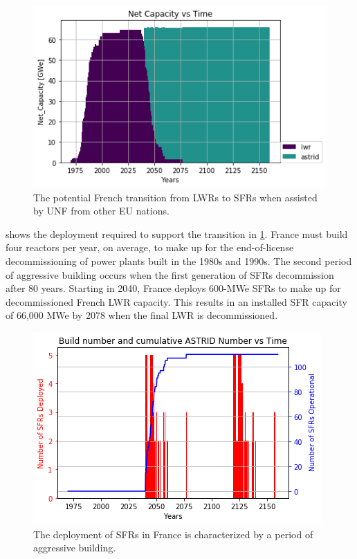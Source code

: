 \documentclass{article}
\begin{document}
\begin{figure}[htbp!]
        \begin{center}
                \includegraphics[scale=0.6]{./images/french-transition/power_plot.png}
        \end{center}
        \caption{The potential French transition from \glspl{LWR} to 
                \glspl{SFR} when assisted by \gls{UNF} from other \gls{EU} 
        nations.}
        \label{fig:sfr_num}
\end{figure}

 shows the deployment required to support the transition in 
\cref{fig:sfr_num}. France must build four reactors per year, on average, to 
make up for the end-of-license decommissioning of power plants built in the 1980s and 1990s.  The second period of aggressive building occurs when the first generation of \glspl{SFR} decommission after 80 years. Starting in 2040, France deploys 600-\gls{MWe} \glspl{SFR} to make up for 
decommissioned French \gls{LWR} capacity. This results in an installed 
\gls{SFR} 
capacity of 66,000 \gls{MWe} by 2078 when the final \gls{LWR} is 
decommissioned. 



\begin{figure}[htbp!]
    \begin{center}
        \includegraphics[scale=0.6]{./images/french-transition/sfr_deploy.png}
    \end{center}
    \caption{The deployment of \glspl{SFR} in France is characterized by a period of
    aggressive building.}
    \label{fig:dep}
\end{figure}
\end{document}
